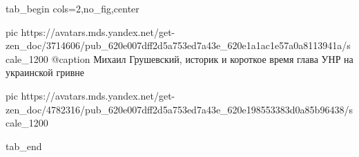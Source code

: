  
 
 
 
 


\ifcmt
  tab_begin cols=2,no_fig,center

     pic https://avatars.mds.yandex.net/get-zen_doc/3714606/pub_620e007dff2d5a753ed7a43e_620e1a1ac1e57a0a8113941a/scale_1200
		 @caption Михаил Грушевский, историк и короткое время глава УНР на украинской гривне

		 pic https://avatars.mds.yandex.net/get-zen_doc/4782316/pub_620e007dff2d5a753ed7a43e_620e198553383d0a85b96438/scale_1200

  tab_end
\fi
